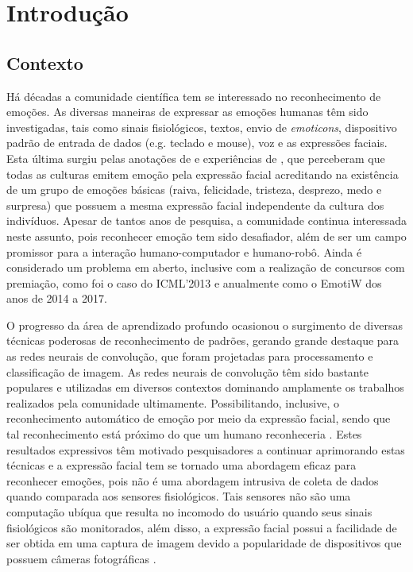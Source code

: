 \chapter{Introdução}\label{sec:introducao}

\section{Contexto}
Há décadas a comunidade científica tem se interessado no reconhecimento de emoções. As diversas maneiras de expressar as emoções humanas têm sido investigadas, tais como sinais fisiológicos, textos, envio de \textit{emoticons}, dispositivo padrão de entrada de dados (e.g. teclado e mouse), voz e as expressões faciais. Esta última surgiu pelas anotações de \cite{darwin1965expression} e experiências de \cite{ekman1994}, que perceberam que todas as culturas emitem emoção pela expressão facial acreditando na existência de um grupo de emoções básicas (raiva, felicidade, tristeza, desprezo, medo e surpresa) que possuem a mesma expressão facial independente da cultura dos indivíduos. Apesar de tantos anos de pesquisa, a comunidade continua interessada neste assunto, pois reconhecer emoção tem sido desafiador, além de ser um campo promissor para a interação humano-computador e humano-robô. Ainda é considerado um problema em aberto, inclusive com a realização de concursos com premiação, como foi o caso do ICML'2013 e anualmente como o EmotiW dos anos de 2014 a 2017.

O progresso da área de aprendizado profundo ocasionou o surgimento de diversas técnicas poderosas de reconhecimento de padrões, gerando grande destaque para as redes neurais de convolução, que foram projetadas para processamento e classificação de imagem. As redes neurais de convolução têm sido bastante populares e utilizadas em diversos contextos dominando amplamente os trabalhos realizados pela comunidade ultimamente. Possibilitando, inclusive, o reconhecimento automático de emoção por meio da expressão facial, sendo que tal reconhecimento está próximo do que um humano reconheceria \citep{kim2016fusing}. Estes resultados expressivos têm motivado pesquisadores a continuar aprimorando estas técnicas e a expressão facial tem se tornado uma abordagem eficaz para reconhecer emoções, pois não é uma abordagem intrusiva de coleta de dados quando comparada aos sensores fisiológicos. Tais sensores não são uma computação ubíqua que resulta no incomodo do usuário quando seus sinais fisiológicos são monitorados, além disso, a expressão facial possui a facilidade de ser obtida em uma captura de imagem devido a popularidade de dispositivos que possuem câmeras fotográficas \citep{cruz2017framework}.

